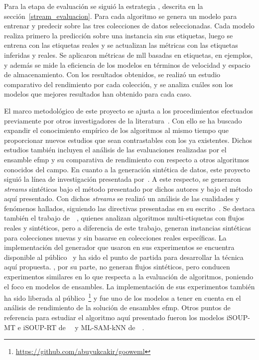 Para la etapa de evaluación se siguió la estrategia
, descrita en la sección~\ref{stream_evaluacion}.
Para cada algoritmo se genera un modelo para entrenar y predecir sobre las tres
colecciones de datos seleccionadas. Cada modelo realiza primero la predicción
sobre una instancia sin sus etiquetas, luego se entrena con las etiquetas reales
y se actualizan las métricas con las etiquetas inferidas y reales. Se aplicaron
métricas de \acrshort{mll} basadas en etiquetas, en ejemplos, y además se mide
la eficiencia de los modelos en términos de velocidad y espacio de
almacenamiento. Con los resultados obtenidos, se realizó un estudio comparativo
del rendimiento por cada colección, y se analiza cuáles son los modelos que
mejores resultados han obtenido para cada caso.

El marco metodológico de este proyecto se ajusta a los procedimientos efectuados
previamente por otros investigadores de la
literatura~\cite{osojnik_multi-label_2017, sousa_multi-label_2018,
	buyukcakir_novel_2018, zheng_survey_2020, read_scalable_2012}. Con ello se ha
buscado expandir el conocimiento empírico de los algoritmos al mismo tiempo que
proporcionar nuevos estudios que sean contrastables con los ya existentes.
Dichos estudios también incluyen el análisis de las evaluaciones realizadas por
el ensamble \acrshort{efmp} y su comparativa de rendimiento con respecto a otros
algoritmos conocidos del campo. En cuanto a la generación sintética de datos,
este proyecto siguió la línea de investigación presentada
por~\citeauthor{read_generating_2009}. A este respecto, se generaron
\textit{streams} sintéticos bajo el método presentado por dichos autores y bajo
el método aquí presentado. Con dichos \textit{streams} se realizó un análisis de
las cualidades y fenómenos hallados, siguiendo las directivas presentadas en su
escrito~\cite{read_generating_2009}. Se destaca también el trabajo
de~\citeauthor{read_scalable_2012}~\cite{read_scalable_2012}, quienes analizan
algoritmos multi-etiquetas con flujos reales y sintéticos, pero a diferencia de
este trabajo, generan instancias sintéticas para colecciones nuevas y sin
basarse en colecciones reales específicas. La implementación del generador que
usaron en sus experimentos se encuentra disponible al
público~\cite{read_moa_2012} y ha sido el punto de partida para desarrollar la
técnica aquí propuesta.  \citeauthor{buyukcakir_novel_2018}, por su parte, no
generan flujos sintéticos, pero conducen experimentos similares en lo que
respecta a la evaluación de algoritmos, poniendo el foco en modelos de
ensambles.  La implementación de sus experimentos también ha sido liberada al
público~\footnote{\url{https://github.com/abuyukcakir/gooweml}} y fue uno de los
modelos a tener en cuenta en el análisis de rendimiento de la solución de
ensambles \acrshort{efmp}. Otros puntos de referencia para estudiar el algoritmo
aquí presentado fueron los modelos iSOUP-MT e iSOUP-RT
de~\citeauthor{osojnik_multi-label_2017}~\cite{osojnik_multi-label_2017} y
ML-SAM-kNN
de~\citeauthor{roseberry_multi-label_2018}~\cite{roseberry_multi-label_2018}.

